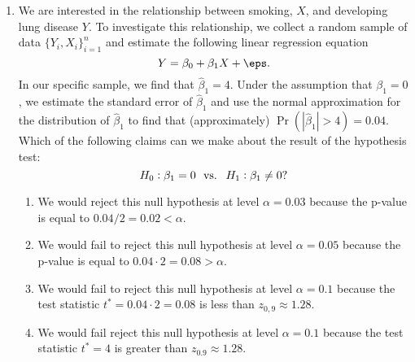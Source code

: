 \documentclass[10pt]{article}
\begin{document}
\begin{enumerate}
	\item We are interested in the relationship between smoking, \(X\), and  developing lung disease \(Y\). To investigate this relationship, we collect a random sample of data  \(\{Y_i,X_i\}_{i=1}^n\) and estimate the following linear regression equation \[ Y = \beta_0 + \beta_1X +\eps.\] In our specific sample, we find that \(\hat\beta_1 = 4\). Under the assumption that \(\beta_1 = 0\), we estimate the standard error of \(\hat\beta_1\) and use the normal approximation for the distribution of \(\hat\beta_1\) to find that (approximately)  \(\Pr(|\hat\beta_1| > 4) = 0.04\). Which of the following claims can we make about the result of the hypothesis test: \[H_0: \beta_1 = 0\hbox{ }\text{ vs. }\hbox{ }H_1:\beta_1 \neq 0?\] 
	\begin{enumerate}
		\item We would reject this null hypothesis at level \(\alpha = 0.03\) because the p-value is equal to  \(0.04/2 = 0.02 <\alpha\).
		\item We would fail to reject this null hypothesis at level \(\alpha = 0.05\) because the p-value is equal to  \(0.04\cdot 2 = 0.08 > \alpha\).
		\item We would fail to reject this null hypothesis at level \(\alpha = 0.1\) because the test statistic \(t^* = 0.04\cdot 2 = 0.08\) is less than \(z_{0,9} \approx 1.28\).
		\item We would fail reject this null hypothesis at level \(\alpha = 0.1\) because the test statistic \(t^* = 4\) is greater than \(z_{0.9} \approx 1.28\).
	\end{enumerate}
	 


\end{enumerate}
\end{document}
